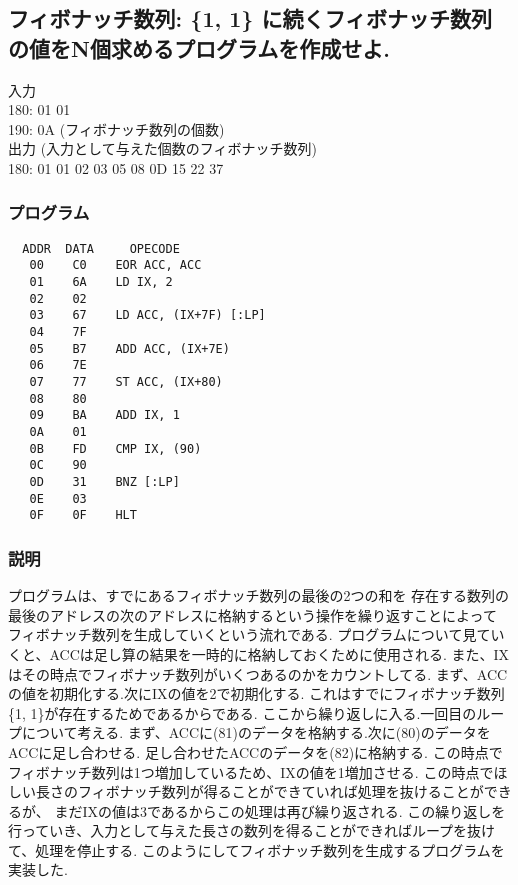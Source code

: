 \documentclass[titlepage]{jsarticle}
\theoremstyle{definition}
\begin{document}
\subsection{フィボナッチ数列: \{1, 1\} に続くフィボナッチ数列の値をN個求めるプログラムを作成せよ.}
入力 \\
180: 01 01 \\
190: 0A (フィボナッチ数列の個数) \\

出力 (入力として与えた個数のフィボナッチ数列) \\
180: 01 01 02 03 05 08 0D 15 22 37 \\

\subsubsection{プログラム}

\begin{lstlisting}
  ADDR  DATA     OPECODE
   00    C0    EOR ACC, ACC
   01    6A    LD IX, 2
   02    02
   03    67    LD ACC, (IX+7F) [:LP]
   04    7F
   05    B7    ADD ACC, (IX+7E)
   06    7E
   07    77    ST ACC, (IX+80)
   08    80
   09    BA    ADD IX, 1
   0A    01
   0B    FD    CMP IX, (90)
   0C    90
   0D    31    BNZ [:LP]
   0E    03
   0F    0F    HLT
\end{lstlisting}


\subsubsection{説明}
プログラムは、すでにあるフィボナッチ数列の最後の2つの和を
存在する数列の最後のアドレスの次のアドレスに格納するという操作を繰り返すことによって
フィボナッチ数列を生成していくという流れである.
プログラムについて見ていくと、ACCは足し算の結果を一時的に格納しておくために使用される.
また、IXはその時点でフィボナッチ数列がいくつあるのかをカウントしてる.
まず、ACCの値を初期化する.次にIXの値を2で初期化する.
これはすでにフィボナッチ数列\{1, 1\}が存在するためであるからである.
ここから繰り返しに入る.一回目のループについて考える.
まず、ACCに(81)のデータを格納する.次に(80)のデータをACCに足し合わせる.
足し合わせたACCのデータを(82)に格納する.
この時点でフィボナッチ数列は1つ増加しているため、IXの値を1増加させる.
この時点でほしい長さのフィボナッチ数列が得ることができていれば処理を抜けることができるが、
まだIXの値は3であるからこの処理は再び繰り返される.
この繰り返しを行っていき、入力として与えた長さの数列を得ることができればループを抜けて、処理を停止する.
このようにしてフィボナッチ数列を生成するプログラムを実装した.
\end{document}
